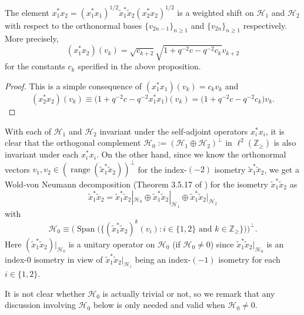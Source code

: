 \documentclass[pdftex]{sigma}
\begin{document}
\begin{corollary}\label{weight_shift} The element $x_{1}^{\ast}x_{2}=( x_{1}^{\ast}x_{1})
^{1/2}\tilde{x}_{1}^{\ast}\tilde{x}_{2}( x_{2}^{\ast}x_{2})
^{1/2}$ is a weighted shift on $\mathcal{H}_{1}$ and $\mathcal{H}_{2}$ with
respect to the orthonormal bases $\{ v_{2n-1}\} _{n\geq1}$ and
$\{ v_{2n}\} _{n\geq1}$ respectively. More precisely,
\[
( x_{1}^{\ast}x_{2}) ( v_{k}) =\sqrt{c_{k+2}}%
\sqrt{1+q^{-2}c-q^{-2}c_{k}}v_{k+2}%
\]
for the constants $c_{k}$ specified in the above proposition.
\end{corollary}
\begin{proof} This is a simple consequence of $( x_{1}^{\ast}x_{1})
( v_{k}) =c_{k}v_{k}$ and
\[
( x_{2}^{\ast}x_{2}) ( v_{k}) \equiv\big(
1+q^{-2}c-q^{-2}x_{1}^{\ast}x_{1}\big) ( v_{k}) =\big(
1+q^{-2}c-q^{-2}c_{k}\big) v_{k} .\tag*{\qed}
\]\renewcommand{\qed}{}
\end{proof}

With each of $\mathcal{H}_{1}$ and $\mathcal{H}_{2}$ invariant under the
self-adjoint operators $x_{i}^{\ast}x_{i}$, it is clear that the orthogonal
complement $\mathcal{H}_{0}:=( \mathcal{H}_{1}\oplus\mathcal{H}%
_{2}) ^{\perp}$ in $\ell^{2}( \mathbb{Z}_{\geq}) $ is also
invariant under each $x_{i}^{\ast}x_{i}$. On the other hand, since we know the
orthonormal vectors $v_{1},v_{2}\in( \operatorname{range}(
\tilde{x}_{1}^{\ast}\tilde{x}_{2}) ) ^{\perp}$ for the
index-$( -2) $ isometry $\tilde{x}_{1}^{\ast}\tilde{x}_{2}$, we
get a Wold-von Neumann decomposition (Theorem 3.5.17 of \cite{Mu}) for the
isometry $\tilde{x}_{1}^{\ast}\tilde{x}_{2}$ as
\[
\tilde{x}_{1}^{\ast}\tilde{x}_{2}=\tilde{x}_{1}^{\ast}\tilde{x}_{2}%
|_{\mathcal{H}_{0}}\oplus\tilde{x}_{1}^{\ast}\tilde{x}_{2}|_{\mathcal{H}_{1}%
}\oplus\tilde{x}_{1}^{\ast}\tilde{x}_{2}|_{\mathcal{H}_{2}}%
\]
with
\[
\mathcal{H}_{0}\equiv\big( \operatorname{Span}\big( \big\{ (
\tilde{x}_{1}^{\ast}\tilde{x}_{2}) ^{k}( v_{i})
\colon i\in\{ 1,2\} \text{ and }k\in\mathbb{Z}_{\geq}\big\} \big)
\big) ^{\perp} .
\]
Here $( \tilde{x}_{1}^{\ast}\tilde{x}_{2}) |_{\mathcal{H}_{0}}$
is a unitary operator on $\mathcal{H}_{0}$ (if $\mathcal{H}_{0}\neq0$) since
$\tilde{x}_{1}^{\ast}\tilde{x}_{2}|_{\mathcal{H}_{0}}$ is an index-$0$
isometry in view of $\tilde{x}_{1}^{\ast}\tilde{x}_{2}|_{\mathcal{H}_{i}}$
being an index-$( -1) $ isometry for each $i\in\{
1,2\} $.

It is not clear whether $\mathcal{H}_{0}$ is actually trivial or not, so we
remark that any discussion involving $\mathcal{H}_{0}$ below is only needed
and valid when $\mathcal{H}_{0}\neq0$.
\end{document}
